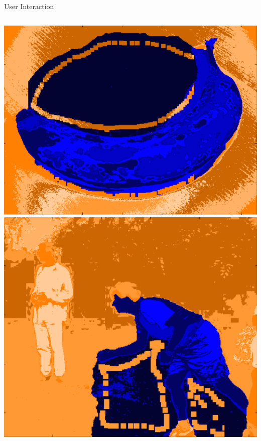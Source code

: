 \documentclass[compress,aspectratio=43]{beamer}
\begin{document}
\begin{frame}{User Interaction}
\begin{columns}[t]
{\includegraphics[width=1\linewidth]{figures/user_interaction/banana/user1_iter1.png}\\
\includegraphics[width=1\linewidth]{figures/user_interaction/bool/user1_iter1.png}
}
\end{columns}
\end{frame}
\end{document}
